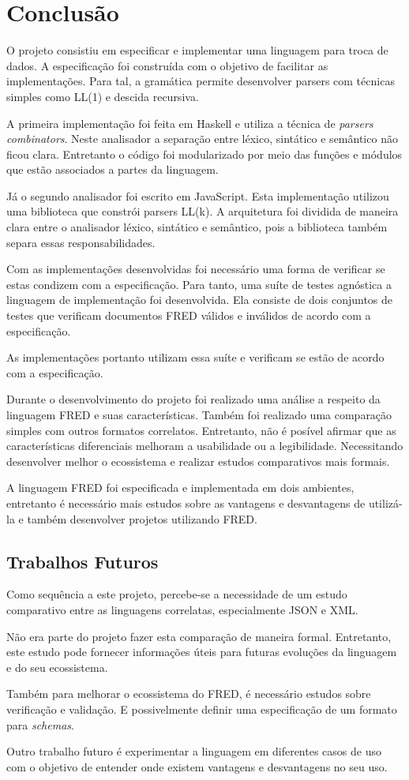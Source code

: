 \chapter[Conclusão]{Conclusão}

O projeto consistiu em especificar e implementar uma linguagem para troca de dados.
A especificação foi construída com o objetivo de facilitar as implementações.
Para tal, a gramática permite desenvolver parsers com técnicas simples como 
LL(1) e descida recursiva.

A primeira implementação foi feita em Haskell e utiliza a técnica
de \textit{parsers combinators}. Neste analisador a separação entre léxico, sintático
e semântico não ficou clara. Entretanto o código foi modularizado por meio
das funções e módulos que estão associados a partes da linguagem.

Já o segundo analisador foi escrito em JavaScript. Esta implementação
utilizou uma biblioteca que constrói parsers LL(k). A arquitetura foi dividida 
de maneira clara entre o analisador léxico, sintático e semântico, pois
a biblioteca também separa essas responsabilidades.

Com as implementações desenvolvidas foi necessário uma forma de verificar se estas
condizem com a especificação. Para tanto, uma suíte de testes agnóstica a linguagem
de implementação foi desenvolvida. Ela consiste de dois conjuntos de testes
que verificam documentos FRED válidos e inválidos de acordo com a especificação.

As implementações portanto utilizam essa suíte e verificam se estão de 
acordo com a especificação.

Durante o desenvolvimento do projeto foi realizado uma análise a 
respeito da linguagem FRED e suas características. Também foi realizado
uma comparação simples com outros formatos correlatos. Entretanto,
não é posível afirmar que as características diferenciais melhoram
a usabilidade ou a legibilidade. Necessitando desenvolver melhor o
ecossistema e realizar estudos comparativos mais formais.

A linguagem FRED foi especificada e implementada em dois ambientes,
entretanto é necessário mais estudos sobre as vantagens e desvantagens
de utilizá-la e também desenvolver projetos utilizando FRED.

\section{Trabalhos Futuros}

Como sequência a este projeto, percebe-se a necessidade de
um estudo comparativo entre as linguagens correlatas, especialmente JSON e XML.

Não era parte do projeto fazer esta comparação de maneira formal. Entretanto,
este estudo pode fornecer informações úteis para futuras evoluções da linguagem
e do seu ecossistema.

Também para melhorar o ecossistema do FRED, é necessário estudos
sobre verificação e validação. E possivelmente definir uma especificação 
de um formato para \textit{schemas}.

Outro trabalho futuro é experimentar a linguagem em diferentes casos de uso
com o objetivo de entender onde existem vantagens e desvantagens no seu uso.
